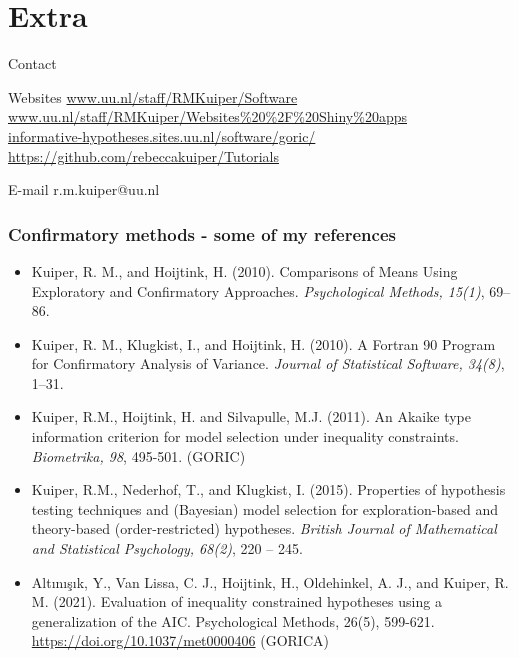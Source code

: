 \documentclass[10pt]{beamer}\usepackage[]{graphicx}\usepackage[]{xcolor}
\begin{document}
\section{Extra} 
%
%
\begin{frame}{Contact}

\begin{block}{Websites}
\url{www.uu.nl/staff/RMKuiper/Software}\\
\url{www.uu.nl/staff/RMKuiper/Websites\%20\%2F\%20Shiny\%20apps}\\
\url{informative-hypotheses.sites.uu.nl/software/goric/}
\url{https://github.com/rebeccakuiper/Tutorials}
\end{block}

\begin{block}{E-mail}
r.m.kuiper@uu.nl
\end{block}

\end{frame}
%
\begin{frame}
	\frametitle{Confirmatory methods - some of my references}
	
	\footnotesize{
		\begin{itemize}
			\item Kuiper, R. M., and Hoijtink, H. (2010). Comparisons of Means Using Exploratory and Confirmatory Approaches. \emph{Psychological Methods, 15(1)}, 69--86.\\
			\item Kuiper, R. M., Klugkist, I., and Hoijtink, H. (2010). A Fortran 90 Program for Confirmatory Analysis of Variance. \emph{Journal of Statistical Software, 34(8)}, 1--31.\\
			\item Kuiper, R.M., Hoijtink, H. and Silvapulle, M.J. (2011). An Akaike type information criterion for model selection under inequality constraints. \emph{Biometrika, 98}, 495-501. (GORIC)\\
			\item Kuiper, R.M., Nederhof, T., and Klugkist, I. (2015). Properties of hypothesis testing techniques and (Bayesian) model selection for exploration-based and theory-based (order-restricted) hypotheses. \emph{British Journal of Mathematical and Statistical Psychology, 68(2)}, 220 -- 245. \\
			\item 	Alt{\i}n{\i}\c{s}{\i}k, Y., Van Lissa, C. J., Hoijtink, H., Oldehinkel, A. J., and Kuiper, R. M. (2021). Evaluation of inequality constrained hypotheses using a generalization of the AIC. Psychological Methods, 26(5), 599-621. \url{https://doi.org/10.1037/met0000406} (GORICA)
		\end{itemize}
	}
\end{frame}
\end{document}
